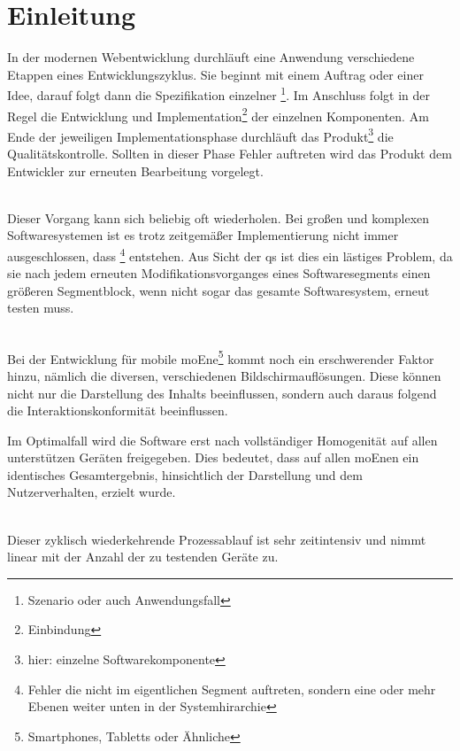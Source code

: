 \chapter{Einleitung}

In der modernen Webentwicklung durchläuft eine Anwendung verschiedene Etappen eines Entwicklungszyklus. Sie beginnt mit einem Auftrag oder einer Idee, darauf folgt dann die Spezifikation einzelner \footnote{Szenario oder auch Anwendungsfall}. Im Anschluss folgt in der Regel die Entwicklung und Implementation\footnote{Einbindung} der einzelnen Komponenten. Am Ende der jeweiligen Implementationsphase durchläuft das Produkt\footnote{hier: einzelne Softwarekomponente} die Qualitätskontrolle. Sollten in dieser Phase Fehler auftreten wird das Produkt dem Entwickler zur erneuten Bearbeitung vorgelegt.

\\Dieser Vorgang kann sich beliebig oft wiederholen. Bei großen und komplexen Softwaresystemen ist es trotz zeitgemäßer Implementierung nicht immer ausgeschlossen, dass \footnote{Fehler die nicht im eigentlichen Segment auftreten, sondern eine oder mehr Ebenen weiter unten in der Systemhirarchie} entstehen. Aus Sicht der \Gls{qs} ist dies ein lästiges Problem, da sie  nach jedem erneuten Modifikationsvorganges eines Softwaresegments einen größeren Segmentblock, wenn nicht sogar das gesamte Softwaresystem, erneut testen muss.

\\Bei der Entwicklung für mobile \Gls{moEn}e\footnote{Smartphones, \Gls{Tablet}ts  oder Ähnliche} kommt noch ein erschwerender Faktor hinzu, nämlich die diversen, verschiedenen Bildschirmauflösungen. Diese können nicht nur die Darstellung des Inhalts beeinflussen, sondern auch daraus folgend die Interaktionskonformität beeinflussen.


Im Optimalfall wird die Software erst nach vollständiger Homogenität auf allen unterstützen Geräten freigegeben. Dies bedeutet, dass auf allen \Gls{moEn}en ein identisches Gesamtergebnis, hinsichtlich der Darstellung und dem Nutzerverhalten, erzielt wurde. 

\\Dieser zyklisch wiederkehrende Prozessablauf ist sehr zeitintensiv und nimmt linear mit der Anzahl der zu testenden Geräte zu.

